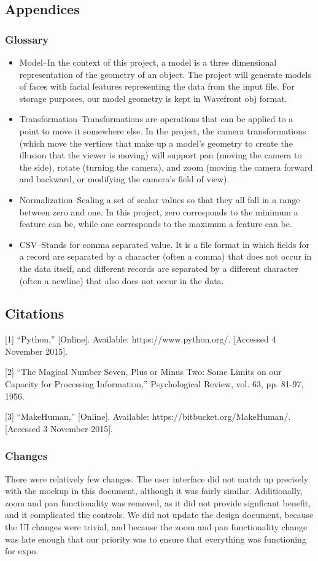 \documentclass[letterpaper,10pt, onecolumn, draftclsnofoot]{IEEEtran}
\begin{document}
\subsection{Appendices}
\subsubsection{Glossary}
\begin{itemize}
	\item Model--In the context of this project, a model is a three dimensional representation of the geometry of an object. The project will generate models of faces with facial features representing the data from the input file. For storage purposes, our model geometry is kept in Wavefront obj format.
	\item Transformation--Transformations are operations that can be applied to a point to move it somewhere else. In the project, the camera transformations (which move the vertices that make up a model's geometry to create the illusion that the viewer is moving) will support pan (moving the camera to the side), rotate (turning the camera), and zoom (moving the camera forward and backward, or modifying the camera's field of view).
	\item Normalization--Scaling a set of scalar values so that they all fall in a range between zero and one. In this project, zero corresponds to the minimum a feature can be, while one corresponds to the maximum a feature can be.
	\item CSV--Stands for comma separated value. It is a file format in which fields for a record are separated by a character (often a comma) that does not occur in the data itself, and different records are separated by a different character (often a newline) that also does not occur in the data.
\end{itemize}

\subsection{Citations}
[1] ``Python,'' [Online]. Available: https://www.python.org/. [Accessed 4 November 2015].

[2] ``The Magical Number Seven, Plus or Minus Two: Some Limits on our Capacity for Processing Information,'' Psychological Review, vol. 63, pp. 81-97, 1956. 

[3] ``MakeHuman,'' [Online]. Available: https://bitbucket.org/MakeHuman/. [Accessed 3 November 2015].


\subsubsection{Changes}
There were relatively few changes. The user interface did not match up precisely with the mockup in this document, although it was fairly similar. Additionally, zoom and pan functionality was removed, as it did not provide signficant benefit, and it complicated the controls. We did not update the design document, because the UI changes were trivial, and because the zoom and pan functionality change was late enough that our priority was to ensure that everything was functioning for expo.
\end{document}
